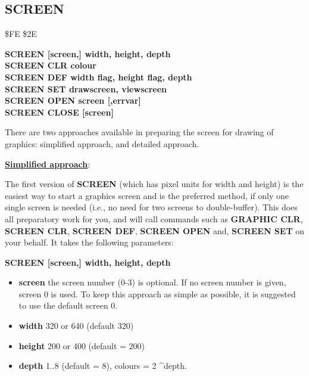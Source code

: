 \subsection{SCREEN}
\begin{description}[leftmargin=2cm,style=nextline]
\item [Token:] \$FE \$2E
\item [Format:] {\bf SCREEN [screen,] width, height, depth} \\
                {\bf SCREEN CLR colour} \\
                {\bf SCREEN DEF width flag, height flag, depth} \\
                {\bf SCREEN SET drawscreen, viewscreen} \\
                {\bf SCREEN OPEN screen [,errvar]} \\
                {\bf SCREEN CLOSE [screen]}

\item [Usage:] There are two approaches available in preparing the screen for
               drawing of graphics: simplified approach, and detailed approach.

    \underline{{\bf Simplified approach}}:

               The first version of {\bf SCREEN} (which has pixel
               units for width and height) is the easiest
               way to start a graphics screen and is the preferred
               method, if only one single screen is needed (i.e., no need
               for two screens to double-buffer). This does all
               preparatory work for you, and will call commands such as
               {\bf GRAPHIC CLR}, {\bf SCREEN CLR}, {\bf SCREEN DEF},
               {\bf SCREEN OPEN} and, {\bf SCREEN SET}
               on your behalf. It takes the following parameters:

               {\bf SCREEN [screen,] width, height, depth}

               \begin{itemize}
                \item {\bf screen} the screen number (0-3) is optional.
                If no screen number is given, screen 0 is used. To keep
                   this approach as simple as possible, it is suggested to
                   use the default screen 0.
                \item {\bf width} 320 or 640 (default 320)
                \item {\bf height} 200 or 400 (default = 200)
                \item {\bf depth} 1..8 (default = 8),
                   colours = 2 \textasciicircum depth.
               \end{itemize}


\end{description}
